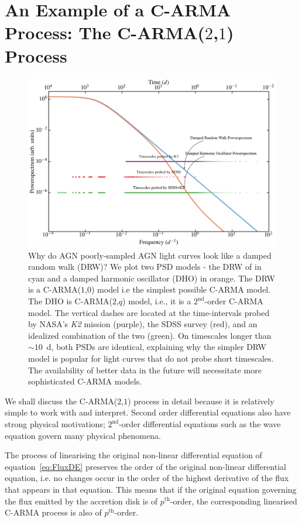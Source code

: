 \documentclass[a4paper,fleqn,usenatbib]{mnras}
\begin{document}
\section[C-ARMA($2$,$1$)]{An Example of a C-ARMA Process: The C-ARMA($2$,$1$) Process}\label{sec:CARMA21}

\begin{figure}
    \includegraphics[width=\textwidth]{Figure1.jpg}
    \caption{Why do AGN poorly-sampled AGN light curves look like a damped random walk (DRW)? We plot two PSD models - the DRW of \citet{Kelly09} in cyan and a damped harmonic oscillator (DHO) in orange. The DRW is a C-ARMA($1$,$0$) model i.e  the simplest possible C-ARMA model. The DHO is C-ARMA($2$,$q$) model, i.e., it is a $2^{\text{nd}}$-order C-ARMA model. The vertical dashes are located at the time-intervals probed by NASA's \textit{K2} mission (purple), the SDSS survey (red), and an idealized combination of the two (green). On timescales longer than $\sim 10$~d, both PSDs are identical, explaining why the simpler DRW model is popular for light curves that do not probe short timescales. The availability of better data in the future will necessitate more sophisticated C-ARMA models.}
    \label{fig:PowerOfSDSSK2}
\end{figure}

We shall discuss the C-ARMA($2$,$1$) process in detail because it is relatively simple to work with and interpret. Second order differential equations also have strong physical motivations; $2^{\mathrm{nd}}$-order differential equations such as the wave equation govern many physical phenomena.

The process of linearising the original non-linear differential equation of equation~\eqref{eq:FluxDE} preserves the order of the original non-linear differential equation, i.e. no changes occur in the order of the highest derivative of the flux that appears in that equation. This means that if the original equation governing the flux emitted by the accretion disk is of $p^{\mathrm{th}}$-order, the corresponding linearised C-ARMA process is also of $p^{\mathrm{th}}$-order. %
\end{document}
